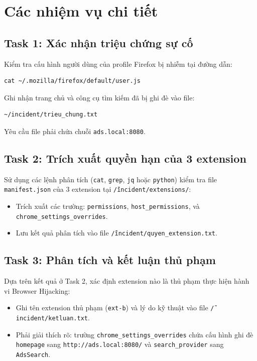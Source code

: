 \section{Các nhiệm vụ chi tiết}

\subsection{Task 1: Xác nhận triệu chứng sự cố}
Kiểm tra cấu hình người dùng của profile Firefox bị nhiễm tại đường dẫn:
\begin{verbatim}
cat ~/.mozilla/firefox/default/user.js
\end{verbatim}
Ghi nhận trang chủ và công cụ tìm kiếm đã bị ghi đè vào file:
\begin{verbatim}
~/incident/trieu_chung.txt
\end{verbatim}
Yêu cầu file phải chứa chuỗi \texttt{ads.local:8080}.

\subsection{Task 2: Trích xuất quyền hạn của 3 extension}
Sử dụng các lệnh phân tích (\texttt{cat}, \texttt{grep}, \texttt{jq} hoặc \texttt{python}) kiểm tra file \texttt{manifest.json} của 3 extension tại \texttt{\~/incident/extensions/}:
\begin{itemize}
    \item Trích xuất các trường: \texttt{permissions}, \texttt{host\_permissions}, và \texttt{chrome\_settings\_overrides}.
    \item Lưu kết quả phân tích vào file \texttt{\~/incident/quyen\_extension.txt}.
\end{itemize}

\subsection{Task 3: Phân tích và kết luận thủ phạm}
Dựa trên kết quả ở Task 2, xác định extension nào là thủ phạm thực hiện hành vi Browser Hijacking:
\begin{itemize}
    \item Ghi tên extension thủ phạm (\texttt{ext-b}) và lý do kỹ thuật vào file \texttt{\~/incident/ketluan.txt}.
    \item Phải giải thích rõ: trường \texttt{chrome\_settings\_overrides} chứa cấu hình ghi đè \texttt{homepage} sang \texttt{http://ads.local:8080/} và \texttt{search\_provider} sang \texttt{AdsSearch}.
\end{itemize}

